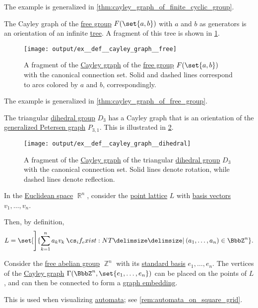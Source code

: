 \begin{example}
\begin{thmenum}
    The example is generalized in \cref{thm:cayley_graph_of_finite_cyclic_group}.

     The Cayley graph of the \hyperref[def:free_group]{free group} \( F(\set{ a, b }) \) with \( a \) and \( b \) as generators is an orientation of an infinite \hyperref[def:tree]{tree}. A fragment of this tree is shown in \cref{fig:ex:def:cayley_graph/free}.

    \begin{figure}[!ht]
      \centering
      \texttt{[image: output/ex\_\_def\_\_cayley\_graph\_\_free]}
      \caption{A fragment of the \hyperref[def:cayley_graph]{Cayley graph} of the \hyperref[def:free_group]{free group} \( F(\set{ a, b }) \) with the canonical connection set. Solid and dashed lines correspond to arcs colored by \( a \) and \( b \), correspondingly.}\label{fig:ex:def:cayley_graph/free}
    \end{figure}

    The example is generalized in \cref{thm:cayley_graph_of_free_group}.

     The triangular \hyperref[def:dihedral_group]{dihedral group} \( D_3 \) has a Cayley graph that is an orientation of the \hyperref[def:petersen_graph]{generalized Petersen graph} \( P_{3,1} \). This is illustrated in \cref{fig:ex:def:cayley_graph/dihedral}.

    \begin{figure}[!ht]
      \centering
      \texttt{[image: output/ex\_\_def\_\_cayley\_graph\_\_dihedral]}
      \caption{A fragment of the \hyperref[def:cayley_graph]{Cayley graph} of the triangular \hyperref[def:dihedral_group]{dihedral group} \( D_3 \) with the canonical connection set. Solid lines denote rotation, while dashed lines denote reflection.}\label{fig:ex:def:cayley_graph/dihedral}
    \end{figure}

     In the \hyperref[def:euclidean_space]{Euclidean space} \( \BbbR^n \), consider the \hyperref[def:point_lattice]{point lattice} \( L \) with \hyperref[def:point_lattice_basis]{basis vectors} \( v_1, \ldots, v_n \).

    Then, by definition,
    \begin{equation*}
      L = \set[\Bigg]{ \sum_{k=1}^n a_k v_k \given* (a_1, \ldots, a_n) \in \BbbZ^n }.
    \end{equation*}

    Consider the \hyperref[def:free_abelian_group]{free abelian group} \( \BbbZ^n \) with its \hyperref[def:coordinate_space]{standard basis} \( e_1, \ldots, e_n \). The vertices of the \hyperref[def:cayley_graph]{Cayley graph} \( \Gamma(\BbbZ^n, \set{ e_1, \ldots, e_n }) \) can be placed on the points of \( L \), and can then be connected to form a \hyperref[def:graph_geometric_realization/embedding]{graph embedding}.

    This is used when visualizing \hyperref[def:cellular_automaton]{automata}; see \cref{rem:automata_on_square_grid}.
  \end{thmenum}
\end{example}

